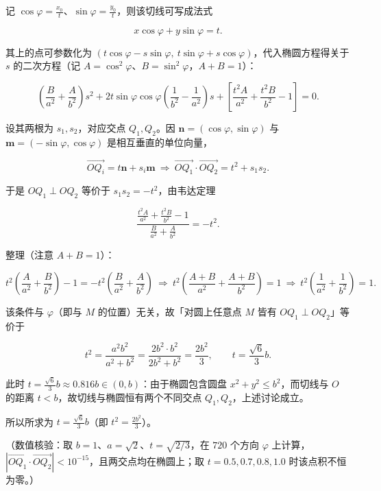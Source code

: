 \begin{answer}
记 $\cos\varphi=\frac{x_0}t$、$\sin\varphi=\frac{y_0}t$，则该切线可写成法式

\nopagebreak[4]
\[x\cos\varphi+y\sin\varphi=t .\]

其上的点可参数化为 $\left(t\cos\varphi-s\sin\varphi,\ t\sin\varphi+s\cos\varphi\right)$，代入椭圆方程得关于 $s$ 的二次方程（记 $A=\cos^2\varphi$、$B=\sin^2\varphi$，$A+B=1$）：

\nopagebreak[4]
\[\left(\frac{B}{a^2}+\frac{A}{b^2}\right)s^2+2t\sin\varphi\cos\varphi\left(\frac1{b^2}-\frac1{a^2}\right)s+\left[\frac{t^2A}{a^2}+\frac{t^2B}{b^2}-1\right]=0 .\]

设其两根为 $s_1,s_2$，对应交点 $Q_1,Q_2$。因 $\boldsymbol n=(\cos\varphi,\sin\varphi)$ 与 $\boldsymbol m=(-\sin\varphi,\cos\varphi)$ 是相互垂直的单位向量，

\nopagebreak[4]
\[\overrightarrow{OQ_i}=t\boldsymbol n+s_i\boldsymbol m\ \Longrightarrow\ \overrightarrow{OQ_1}\cdot\overrightarrow{OQ_2}=t^2+s_1s_2 .\]

于是 $OQ_1\perp OQ_2$ 等价于 $s_1s_2=-t^2$，由韦达定理

\nopagebreak[4]
\[\frac{\frac{t^2A}{a^2}+\frac{t^2B}{b^2}-1}{\frac{B}{a^2}+\frac{A}{b^2}}=-t^2 .\]

整理（注意 $A+B=1$）：

\nopagebreak[4]
\[t^2\left(\frac{A}{a^2}+\frac{B}{b^2}\right)-1=-t^2\left(\frac{B}{a^2}+\frac{A}{b^2}\right)\ \Longrightarrow\ t^2\left(\frac{A+B}{a^2}+\frac{A+B}{b^2}\right)=1\ \Longrightarrow\ t^2\left(\frac1{a^2}+\frac1{b^2}\right)=1 .\]

该条件与 $\varphi$（即与 $M$ 的位置）无关，故「对圆上任意点 $M$ 皆有 $OQ_1\perp OQ_2$」等价于

\nopagebreak[4]
\[t^2=\frac{a^2b^2}{a^2+b^2}=\frac{2b^2\cdot b^2}{2b^2+b^2}=\frac{2b^2}3,\qquad t=\frac{\sqrt6}3b .\]

此时 $t=\frac{\sqrt6}3b\approx0.816b\in(0,b)$：由于椭圆包含圆盘 $x^2+y^2\leqslant b^2$，而切线与 $O$ 的距离 $t<b$，故切线与椭圆恒有两个不同交点 $Q_1,Q_2$，上述讨论成立。

所以所求为 $t=\frac{\sqrt6}3b$（即 $t^2=\frac{2b^2}3$）。

（数值核验：取 $b=1$、$a=\sqrt2$、$t=\sqrt{2/3}$，在 $720$ 个方向 $\varphi$ 上计算，$\left|\overrightarrow{OQ_1}\cdot\overrightarrow{OQ_2}\right|<10^{-15}$，且两交点均在椭圆上；取 $t=0.5,0.7,0.8,1.0$ 时该点积不恒为零。）


\end{answer}